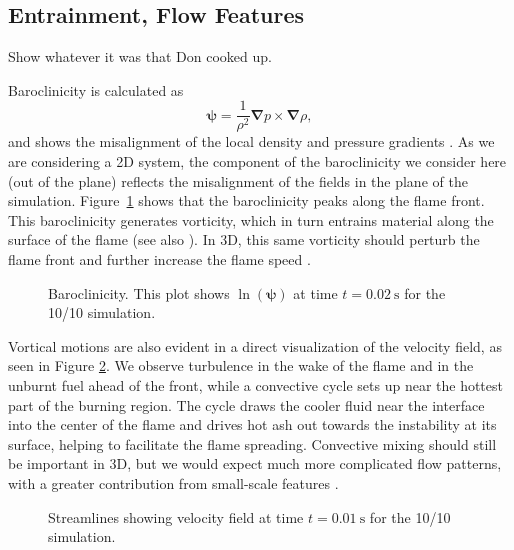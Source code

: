 \documentclass[preprint,times,tighten]{aastex63}
\newcommand{\nablab}{\mathbf{\nabla}}
\begin{document}

\subsection{Entrainment, Flow Features}

{\color{red} Show whatever it was that Don cooked up.}

Baroclinicity is calculated as
\begin{equation}
    \boldsymbol{\psi} = \frac{1}{\rho^2} \nablab p \times \nablab \rho,
\end{equation}
and shows the misalignment of the local density and pressure gradients
\citep{Malone2014a}. As we are considering a 2D system, the
component of the baroclinicity we consider here (out of the plane)
reflects the misalignment of the fields in the plane of the
simulation. Figure~\ref{fig:baroclinicity} shows that the
baroclinicity peaks along the flame front. This baroclinicity
generates vorticity, which in turn entrains material along the surface
of the flame (see also \citealt{cavecchi:2013}). In 3D, this same vorticity
should perturb the flame front and further increase the flame speed
\citep{Cavecchi2019}.

\begin{figure}[t]
\centering
{}
\caption{\label{fig:baroclinicity} Baroclinicity. This plot shows
$\ln \left(\mathbf{\psi}\right)$ at time $t = 0.02~\mathrm{s}$ for the 10/10 simulation.}
\end{figure}

Vortical motions are also evident in a direct visualization of the velocity field, as seen in
Figure \ref{fig:streamlines}. We observe turbulence in the wake of the flame and in the
unburnt fuel ahead of the front, while a convective cycle sets up near the hottest part of the
burning region. The cycle draws the cooler fluid near the interface into the center of the flame
and drives hot ash out towards the instability at its surface, helping to facilitate the flame
spreading. Convective mixing should still be important in 3D, but we would expect much more
complicated flow patterns, with a greater contribution from small-scale features \citep{xrb3d}.

\begin{figure}[t]
	\centering
	\caption{\label{fig:streamlines} Streamlines showing velocity field at time $t = 0.01~\mathrm{s}$ for the 10/10 simulation.}
\end{figure}
\end{document}
